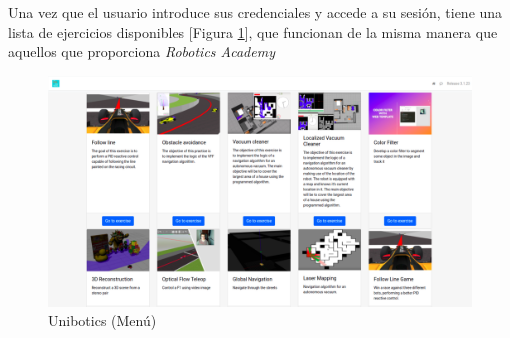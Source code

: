 Una vez que el usuario introduce sus credenciales y accede a su sesión, tiene una lista de ejercicios disponibles [Figura \ref{fig:menu-unibotics}], que funcionan de la misma manera que aquellos que proporciona \textit{Robotics Academy}

\begin{figure} [h!]
  \begin{center}
    \includegraphics[width=15cm]{imagenes/unibotics-menu.png}
  \end{center}
  \caption[Unibotics (Menú)]{Unibotics (Menú)}
  \label{fig:menu-unibotics}
\end{figure}




